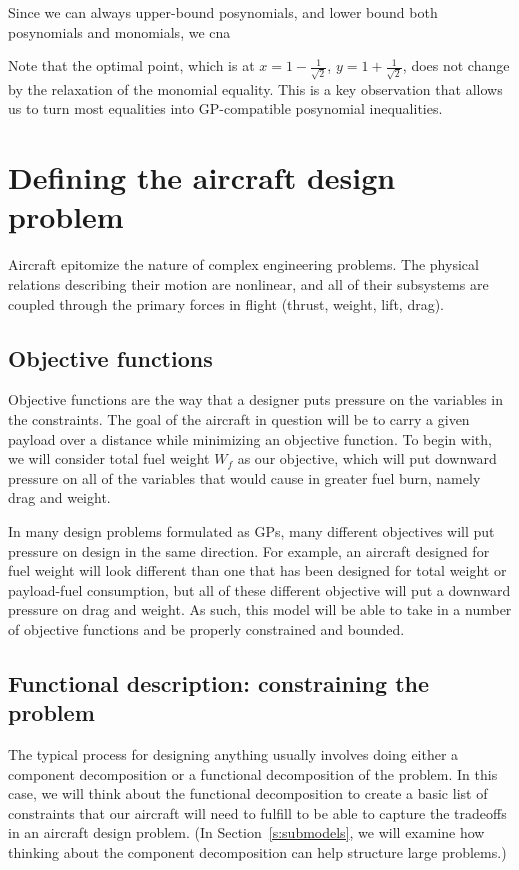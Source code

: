 Since we can always upper-bound posynomials, and lower bound both posynomials
and monomials, we cna


Note that the optimal point, which is at $x = 1 - \frac{1}{\sqrt{2}}$, $y = 1 + \frac{1}{\sqrt{2}}$,
does not change by the relaxation of the monomial equality. This is a key
observation that allows us to turn most equalities into \gls{GP}-compatible
posynomial inequalities.

\section{Defining the aircraft design problem}

Aircraft epitomize the nature of complex engineering problems. The physical 
relations describing their motion are nonlinear, and all of their subsystems are 
coupled through the primary forces in flight (thrust, weight, lift, drag). 

\subsection{Objective functions}

Objective functions are the way that a designer puts pressure on the variables 
in the constraints. The goal of the aircraft in question will be to carry a given payload
over a distance while minimizing an objective function. To begin with, we will consider
total fuel weight $W_f$ as our objective, which will put
downward pressure on all of the variables that would cause in greater fuel burn, namely
drag and weight.

In many design problems
formulated as \gls{GP}s, many different objectives will put pressure on design
in the same direction. For example, an aircraft designed for fuel weight will look
different than one
that has been designed for total weight or payload-fuel consumption, but all of
these different objective will put a downward pressure on drag and weight.
As such, this model will be able to take in a number of objective functions
and be properly constrained and bounded.

\subsection{Functional description: constraining the problem}

The typical process for designing anything usually involves doing either a
component decomposition or a functional decomposition of the problem. In
this case, we will think about the functional decomposition to create a
basic list of constraints that our aircraft will need to fulfill to be
able to capture the tradeoffs in an aircraft design problem. (In
Section~\ref{s:submodels}, we will examine how thinking about the component decomposition
can help structure large problems.)

